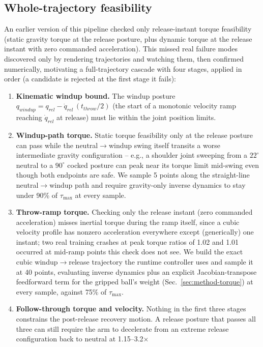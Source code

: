 \documentclass[conference]{IEEEtran}
\begin{document}
\subsection{Whole-trajectory feasibility}
\label{sec:method-feasibility}
An earlier version of this pipeline checked only release-instant torque
feasibility (static gravity torque at the release posture, plus dynamic
torque at the release instant with zero commanded acceleration). This
missed real failure modes discovered only by rendering trajectories and
watching them, then confirmed numerically, motivating a full-trajectory
cascade with four stages, applied in order (a candidate is rejected at the
first stage it fails):

\begin{enumerate}
\item \textbf{Kinematic windup bound.} The windup posture
$q_{windup} = q_{rel} - \dot q_{rel}\,(t_{throw}/2)$ (the start of a
monotonic velocity ramp reaching $\dot q_{rel}$ at release) must lie within
the joint position limits.
\item \textbf{Windup-path torque.} Static torque feasibility only at the
release posture can pass while the neutral$\to$windup swing itself
transits a worse intermediate gravity configuration -- e.g., a shoulder
joint sweeping from a $22^\circ$ neutral to a $90^\circ$ cocked posture can
peak near its torque limit mid-swing even though both endpoints are safe.
We sample 5 points along the straight-line neutral$\to$windup path and
require gravity-only inverse dynamics to stay under 90\% of $\tau_{\max}$
at every sample.
\item \textbf{Throw-ramp torque.} Checking only the release instant
(zero commanded acceleration) misses inertial torque during the ramp
itself, since a cubic velocity profile has nonzero acceleration everywhere
except (generically) one instant; two real training crashes at peak
torque ratios of 1.02 and 1.01 occurred at mid-ramp points this check
does not see. We build the exact cubic windup$\to$release trajectory the
runtime controller uses and sample it at 40 points, evaluating inverse
dynamics plus an explicit Jacobian-transpose feedforward term for the
gripped ball's weight (Sec.~\ref{sec:method-torque}) at every sample,
against 75\% of $\tau_{\max}$.
\item \textbf{Follow-through torque and velocity.} Nothing in the first
three stages constrains the post-release recovery motion. A release
posture that passes all three can still require the arm to decelerate from
an extreme release configuration back to neutral at 1.15--3.2$\times$

\end{enumerate}
\end{document}
